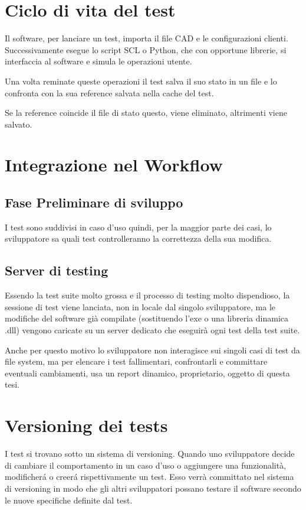     \section{Ciclo di vita del test}
        Il software, per lanciare un test, importa il file CAD e le configurazioni clienti.
        Successivamente esegue lo script SCL o Python, che con opportune librerie, si interfaccia al software
        e simula le operazioni utente. 
        
        Una volta reminate queste operazioni il test salva il suo stato in un file e lo confronta con la sua reference 
        salvata nella cache del test. 

        Se la reference coincide il file di stato questo, viene eliminato, altrimenti viene salvato.

    \section{Integrazione nel Workflow}
        \subsection{Fase Preliminare di sviluppo}
            I test sono suddivisi in caso d'uso quindi, per la maggior parte dei casi, lo sviluppatore sa quali test controlleranno la correttezza della sua modifica.
            
        \subsection{Server di testing}
            Essendo la test suite molto grossa e il processo di testing molto dispendioso, 
            la sessione di test viene lanciata, non in locale dal singolo sviluppatore, 
            ma le modifiche del software già compilate (sostituendo l’exe o una libreria dinamica .dll) 
            vengono caricate su un server dedicato che eseguirà ogni test della test suite.
            
            
            Anche per questo motivo lo sviluppatore non interagisce sui singoli casi di test da file system,
            ma per elencare i test fallimentari, confrontarli e committare eventuali cambiamenti, usa un report dinamico, 
            proprietario, oggetto di questa tesi.
    \section{Versioning dei tests}
        I test si trovano sotto un sistema di versioning.
        Quando uno sviluppatore decide di cambiare il comportamento in un caso d'uso o aggiungere una funzionalità,
        modificher\'a o creer\'a rispettivamente un test.
        Esso verrà committato nel sistema di versioning in modo che gli altri sviluppatori possano testare il software secondo le nuove specifiche definite dal test.
